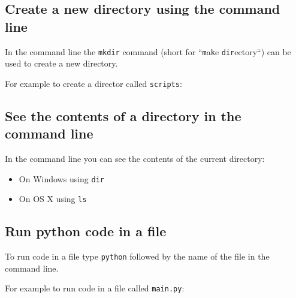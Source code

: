 \subsection{Create a new directory using the command line}
\label{\detokenize{building-tools/04-editor-and-cli/how/main:how-to-create-a-new-directory-in-the-command-line}}

In the command line the \texttt{mkdir} command (short for
``\texttt{m}a\texttt{k}e \texttt{dir}ectory``) can be
used to create a new directory.





For example to create a director called \texttt{scripts}:



\subsection{See the contents of a directory in the command line}
\label{\detokenize{building-tools/04-editor-and-cli/how/main:how-to-see-the-contents-of-a-directory-in-the-command-line}}

In the command line you can see the contents of the current directory:
\begin{itemize}
\item 

On Windows using \texttt{dir}

\item 

On OS X using \texttt{ls}

\end{itemize}




\subsection{Run python code in a file}

To run code in a file type \texttt{python} followed by the name of the file in the
command line.



For example to run code in a file called \texttt{main.py}:

